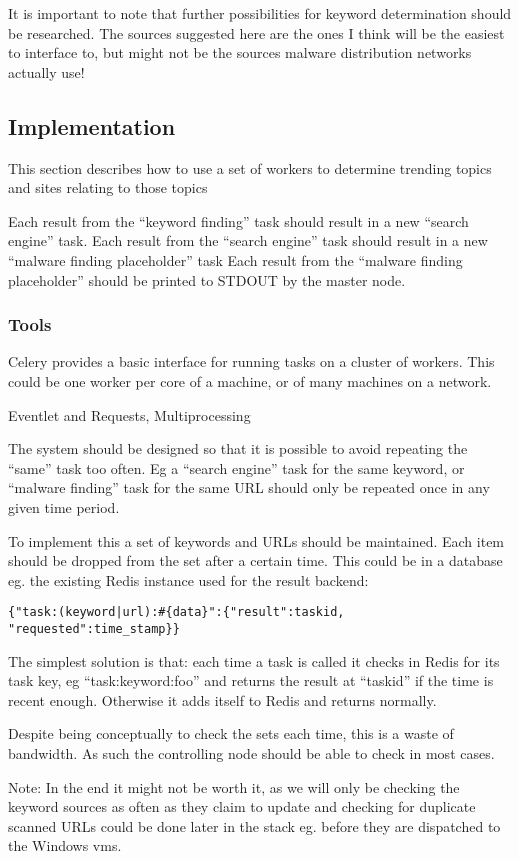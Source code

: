 It is important to note that further possibilities for keyword determination should be researched. The sources suggested here are the ones I think will be the easiest to interface to, but might not be the sources malware distribution networks actually use!

\subsection{Implementation}
This section describes how to use a set of workers to determine trending topics and sites relating to those topics

Each result from the ``keyword finding'' task should result in a new ``search engine'' task.
Each result from the ``search engine'' task should result in a new ``malware finding placeholder'' task
Each result from the ``malware finding placeholder'' should be printed to STDOUT by the master node.
\subsubsection{Tools}
Celery provides a basic interface for running tasks on a cluster of workers. This could be one worker per core of a machine, or of many machines on a network.

Eventlet and Requests, Multiprocessing






The system should be designed so that it is possible to avoid repeating the ``same'' task too often. Eg a ``search engine'' task for the same keyword, or ``malware finding'' task for the same URL should only be repeated once in any given time period.

To implement this a set of keywords and URLs should be maintained. Each item should be dropped from the set after a certain time. This could be in a database eg. the existing Redis instance used for the result backend:

\verb/{"task:(keyword|url):#{data}":{"result":taskid, "requested":time_stamp}}/

The simplest solution is that: each time a task is called it checks in Redis for its task key, eg ``task:keyword:foo'' and returns the result at ``taskid'' if the time is recent enough. Otherwise it adds itself to Redis and returns normally.

Despite being conceptually to check the sets each time, this is a waste of bandwidth. As such the controlling node should be able to check in most cases.

Note: In the end it might not be worth it, as we will only be checking the keyword sources as often as they claim to update and checking for duplicate scanned URLs could be done later in the stack eg. before they are dispatched to the Windows vms.